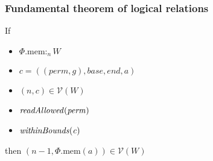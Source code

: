 \documentclass[a4paper]{article}
\newcommand{\var}[1]{\mathit{#1}}
\newcommand{\gl}{\var{g}}
\newcommand{\addr}{\var{a}}
\newcommand{\start}{\var{base}}
\newcommand{\addrend}{\var{end}}
\newcommand{\heap}{\var{mem}}
\newcommand{\perm}{\var{perm}}
\newcommand{\plainproj}[1]{\mathrm{#1}}
\newcommand{\memheap}[1][\Phi]{#1.\plainproj{mem}}
\newcommand{\plainfun}[2]{
  \ifthenelse{\equal{#2}{}}
  {\mathit{#1}}
  {\mathit{#1}(#2)}
}
\newcommand{\readAllowed}[1]{\plainfun{readAllowed}{#1}}
\newcommand{\withinBounds}[1]{\plainfun{withinBounds}{#1}}
\newcommand{\heapSat}[3][\heap]{#1 :_{#2} #3}
\newcommand{\asmType}{\plaindom{AsmType}}
\newcommand{\plaindom}[1]{\mathrm{#1}}
\newcommand{\intr}[2]{\mathcal{#1}}
\newcommand{\valueintr}[1]{\intr{V}{#1}}
\newcommand{\stdvr}{\valueintr{\asmType}}
\newcommand{\npair}[2][n]{\left(#1,#2 \right)}
\begin{document}
\subsubsection{Fundamental theorem of logical relations}

\begin{lemma}
  \label{lem:conds-load-suffice}
  If
  \begin{itemize}
  \item $\heapSat[\memheap]{n}{W}$
  \item $\var{c} = ((\perm,\gl),\start,\addrend,\addr)$
  \item $\npair{c}\in\stdvr(W)$
  \item $\readAllowed{\perm}$
  \item $\withinBounds{\var{c}}$
  \end{itemize}
  then $\npair[n-1]{\memheap(\addr)} \in \stdvr(W)$
\end{lemma}
\end{document}
